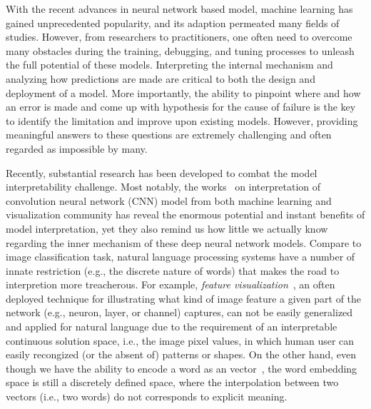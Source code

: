 \maketitle

With the recent advances in neural network based model, machine learning has gained unprecedented popularity, and its adaption permeated many fields of studies.
%
However, from researchers to practitioners, one often need to overcome many obstacles during the training, debugging, and tuning processes to unleash the full potential of these models.
%
Interpreting the internal mechanism and analyzing how predictions are made are critical to both the design and deployment of a model.
More importantly, the ability to pinpoint where and how an error is made and come up with hypothesis for the cause of failure is the key to identify the limitation and improve upon existing models.
However, providing meaningful answers to these questions are extremely challenging and often regarded as impossible by many.

Recently, substantial research has been developed to combat the model interpretability challenge. Most notably, the works~\cite{SimonyanVedaldiZisserman2013, ZeilerFergus2014, YosinskiCluneNguyen2015, OlahMordvintsevSchubert2017, LiuShiLi2017, OlahSatyanarayanJohnson2018, BilalJourablooYe2018} on interpretation of convolution neural network (CNN) model from both machine learning and visualization community has reveal the enormous potential and instant benefits of model interpretation, yet they also remind us how little we actually know regarding the inner mechanism of these deep neural network models.
%
Compare to image classification task, natural language processing systems have a number of innate restriction (e.g., the discrete nature of words) that makes the road to interpretion more treacherous. For example, \emph{feature visualization}~\cite{OlahMordvintsevSchubert2017}, an often deployed technique for illustrating what kind of image feature a given part of the network (e.g., neuron, layer, or channel) captures, can not be easily generalized and applied for natural language due to the requirement of an interpretable continuous solution space, i.e., the image pixel values, in which human user can easily recongized (or the absent of) patterns or shapes. On the other hand, even though we have the ability to encode a word as an vector~\cite{MikolovSutskeverChen2013, PenningtonSocherManning2014}, the word embedding space is still a discretely defined space, where the interpolation between two vectors (i.e., two words) do not corresponds to explicit meaning.

